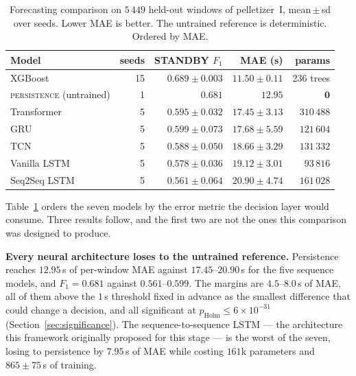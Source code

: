 \begin{table}[t]
\centering
\caption{Forecasting comparison on $5\,449$ held-out windows of
pelletizer~I, mean\,$\pm$\,sd over seeds. Lower MAE is better. The
untrained reference is deterministic. Ordered by MAE.}
\label{tab:forecasting}
\small
\setlength{\tabcolsep}{4pt}
\begin{tabular}{@{}lrrrr@{}}
\toprule
Model & seeds & STANDBY $F_1$ & MAE (s) & params \\
\midrule
XGBoost \cite{chen2016xgboost}          & 15 & $\mathbf{0.689 \pm 0.003}$ & $\mathbf{11.50 \pm 0.11}$ & 236 trees \\
\textsc{persistence} (untrained)        &  1 & $0.681$                    & $12.95$                   & $\mathbf{0}$ \\
Transformer \cite{nie2023patchtst}      &  5 & $0.595 \pm 0.032$          & $17.45 \pm 3.13$          & $310\,488$ \\
GRU \cite{cho2014gru}                   &  5 & $0.599 \pm 0.073$          & $17.68 \pm 5.59$          & $121\,604$ \\
TCN \cite{bai2018tcn}                   &  5 & $0.588 \pm 0.050$          & $18.66 \pm 3.29$          & $131\,332$ \\
Vanilla LSTM \cite{hochreiter1997lstm}  &  5 & $0.578 \pm 0.036$          & $19.12 \pm 3.01$          & $93\,816$ \\
Seq2Seq LSTM \cite{sutskever2014seq2seq}&  5 & $0.561 \pm 0.064$          & $20.90 \pm 4.74$          & $161\,028$ \\
\bottomrule
\end{tabular}
\end{table}

Table~\ref{tab:forecasting} orders the seven models by the error metric
the decision layer would consume. Three results follow, and the first
two are not the ones this comparison was designed to produce.

\textbf{Every neural architecture loses to the untrained reference.}
Persistence reaches $12.95$\,s of per-window MAE against $17.45$--$20.90$\,s
for the five sequence models, and $F_1 = 0.681$ against
$0.561$--$0.599$. The margins are $4.5$--$8.0$\,s of MAE, all of them
above the $1$\,s threshold fixed in advance as the smallest difference
that could change a decision, and all significant at
$p_{\text{Holm}}\le6\times10^{-31}$ (Section~\ref{sec:significance}). The
sequence-to-sequence LSTM --- the architecture this framework originally
proposed for this stage --- is the worst of the seven, losing to
persistence by $7.95$\,s of MAE while costing $161$k parameters and
$865\pm75$\,s of training.

